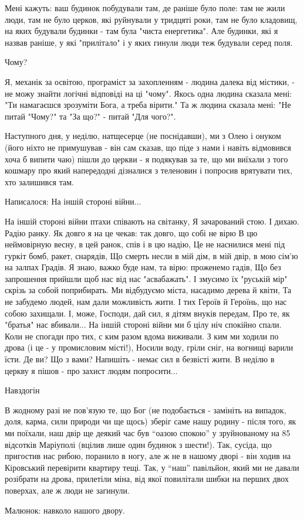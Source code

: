 Мені кажуть: ваш будинок побудували там, де раніше було поле: там не жили люди,
там не було церков, які руйнували у тридцяті роки, там не було кладовищ, на
яких будували будинки - там була "чиста енергетика". Але будинки, які я назвав
раніше, у які "прилітало" і у яких гинули люди теж будували серед поля.

Чому?

Я, механік за освітою, програміст за захопленням - людина далека від містики, -
не можу знайти логічні відповіді на ці "чому". Якось одна людина сказала мені:
"Ти намагаєшся зрозуміти Бога, а треба вірити." Та ж людина сказала мені: "Не
питай "Чому?" та "За що?" - питай "Для чого?".

Наступного дня, у неділю, натщесерце (не поснідавши), ми з Олею і онуком (його
ніхто не примушував - він сам сказав, що піде з нами і навіть відмовився хоча б
випити чаю) пішли до церкви - я подякував за те, що ми виїхали з того кошмару
про який напередодні дізналися з теленовин і попросив врятувати тих, хто
залишився там. 

Написалося: На іншій стороні війни...

\obeycr
На іншій стороні війни птахи співають на світанку,
Я зачарований стою. І дихаю. Радію ранку.
Як довго я на це чекав: так довго, що собі не вірю
В цю неймовірную весну, в цей ранок, спів і в цю надію,
Це не наснилися мені під гуркіт бомб, ракет, снарядів,
Що смерть несли в мій дім, в мій двір, в мою сім'ю на залпах Градів.
Я знаю, важко буде нам, та вірю: проженемо гадів, 
Що без запрошення прийшли щоб нас від нас "асвабажать".
І змусимо їх "руській мір" скрізь за собой поприбирать.
Ми відбудуємо міста, насадимо дерева й квіти,
Та не забудемо людей, нам дали можливість жити.
І тих Героїв й Героїнь, що нас собою захищали.
І, може, Господи, дай сил, я дітям внуків передам, 
Про те, як "братья" нас вбивали...
\smallskip
На іншій стороні війни ми б цілу ніч спокійно спали.
Коли не спогади про тих, с ким разом вдома виживали.
З ким ми ходили по дрова (і це - у промисловим місті!),
Носили воду, гріли сніг, на вогнищі варили їсти. 
Де ви? Що з вами? Напишіть - немає сил в безвісті жити.
В неділю в церкву я пішов - про захист людям попросити...
\restorecr

Навздогін

В жодному разі не пов'язую те, що Бог (не подобається - замініть на випадок,
доля, карма, сили природи чи ще щось) зберіг саме нашу родину - після того, як
ми поїхали, наш двір ще деякий час був \enquote{оазою спокою} у зруйнованому на 85
відсотків Маріуполі (вцілив лише один будинок з шести!). Так, сусіда, що
пригостив нас рибою, поранило в ногу, але ж не в нашому дворі - він ходив на
Кіровський перевірити квартиру тещі. Так, у \enquote{наш} павільйон, який ми не давали
розібрати на дрова, прилетіли міна, від якої повилітали шибки на перших двох
поверхах, але ж люди не загинули.

Малюнок: навколо нашого двору.

